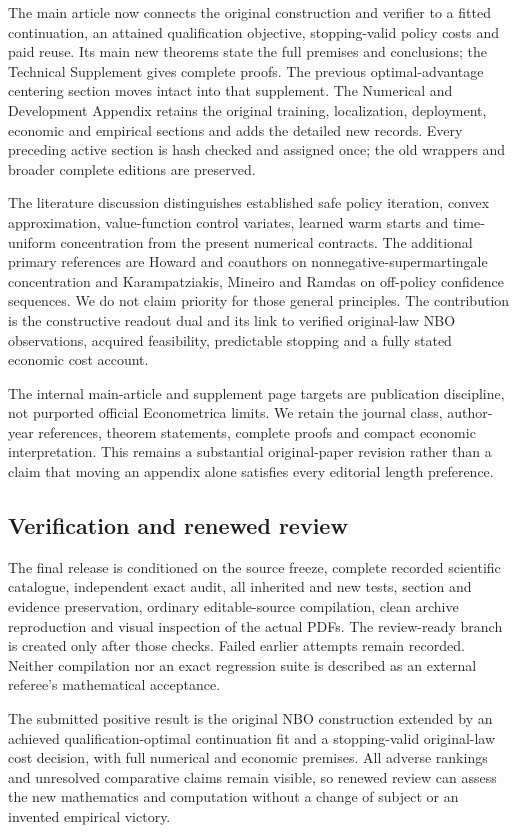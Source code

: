 The main article now connects the original construction and verifier to
a fitted continuation, an attained qualification objective,
stopping-valid policy costs and paid reuse. Its main new theorems state
the full premises and conclusions; the Technical Supplement gives
complete proofs. The previous optimal-advantage centering section moves
intact into that supplement. The Numerical and Development Appendix
retains the original training, localization, deployment, economic and
empirical sections and adds the detailed new records. Every preceding
active section is hash checked and assigned once; the old wrappers and
broader complete editions are preserved.

The literature discussion distinguishes established safe policy
iteration, convex approximation, value-function control variates,
learned warm starts and time-uniform concentration from the present
numerical contracts. The additional primary references are Howard and
coauthors on nonnegative-supermartingale concentration and
Karampatziakis, Mineiro and Ramdas on off-policy confidence sequences.
We do not claim priority for those general principles. The contribution
is the constructive readout dual and its link to verified original-law
NBO observations, acquired feasibility, predictable stopping and a fully
stated economic cost account.

The internal main-article and supplement page targets are publication
discipline, not purported official Econometrica limits. We retain the
journal class, author-year references, theorem statements, complete
proofs and compact economic interpretation. This remains a substantial
original-paper revision rather than a claim that moving an appendix
alone satisfies every editorial length preference.

\hypertarget{verification-and-renewed-review}{%
\subsection{Verification and renewed
review}\label{verification-and-renewed-review}}

The final release is conditioned on the source freeze, complete recorded
scientific catalogue, independent exact audit, all inherited and new
tests, section and evidence preservation, ordinary editable-source
compilation, clean archive reproduction and visual inspection of the
actual PDFs. The review-ready branch is created only after those checks.
Failed earlier attempts remain recorded. Neither compilation nor an
exact regression suite is described as an external referee's
mathematical acceptance.

The submitted positive result is the original NBO construction extended
by an achieved qualification-optimal continuation fit and a
stopping-valid original-law cost decision, with full numerical and
economic premises. All adverse rankings and unresolved comparative
claims remain visible, so renewed review can assess the new mathematics
and computation without a change of subject or an invented empirical
victory.
